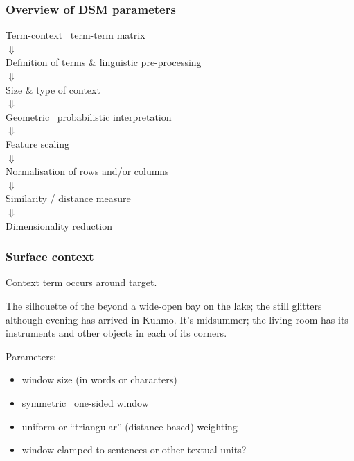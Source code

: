 \documentclass[t]{beamer} %
\begin{document}
\begin{frame}
  \frametitle{Overview of DSM parameters}

  \ungap[1]
  \begin{center}
    Term-context \vs\ term-term matrix\\
    $\Downarrow$\\
    Definition of terms \& linguistic pre-processing\\
    $\Downarrow$\\
    \h{Size \& type of context}\\
    $\Downarrow$\\
    Geometric \vs\ probabilistic interpretation\\
    $\Downarrow$\\
    Feature scaling\\
    $\Downarrow$\\
    Normalisation of rows and/or columns\\
    $\Downarrow$\\
    Similarity / distance measure\\
    $\Downarrow$\\
    Dimensionality reduction
  \end{center}
\end{frame}

\begin{frame}
  \frametitle{Surface context}
  
  \begin{center}
    Context term occurs  around target.
  \end{center}

  The {\color{secondary}silhouette of the} 
  {\color{secondary}beyond a wide-open} bay on {\color{secondary}the lake;
    the}  {\color{secondary}still glitters although} evening
  has arrived in Kuhmo. It's midsummer; the living room has its
  instruments and other objects in each of its corners.
  
  \gap
  Parameters:
  \begin{itemize}
  \item window size (in words or characters)
  \item symmetric \vs\ one-sided window
  \item uniform or ``triangular'' (distance-based) weighting
  \item window clamped to sentences or other textual units?
  \end{itemize}
\end{frame}
\end{document}
